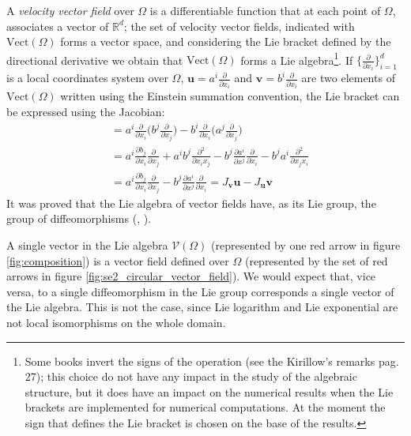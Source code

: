 A \emph{velocity vector field} over $\Omega$ is a differentiable function that at each point of $\Omega$, associates a vector of $\mathbb{R}^d$; the set of velocity vector fields, indicated with $\text{Vect}(\Omega)$ forms a vector space, and considering the Lie bracket defined by the directional derivative
we obtain that $\text{Vect}(\Omega)$ forms a Lie algebra\footnote{
	Some books invert the signs of the operation (see the Kirillow's remarks \cite{kirillov2008introduction} pag. 27); this choice do not have any impact in the study of the algebraic structure, but it does have an impact on the numerical results when the Lie brackets are implemented for numerical computations. At the moment the sign that defines the Lie bracket is chosen on the base of the results.
}.
If $\{\frac{\partial}{\partial x_{i}}\}_{i=1}^{d}$ is a local coordinates system over $\Omega$, $\mathbf{u}=a^{i} \frac{\partial}{\partial x_{i}}$ and $\mathbf{v}=b^{i} \frac{\partial}{\partial x_{i}}$ are two elements of  $\text{Vect}(\Omega)$ written using the Einstein summation convention, the Lie bracket can be expressed using the Jacobian:
\begin{align*}
[\mathbf{u}, \mathbf{v}] &= 
a^{i} \frac{\partial}{\partial x_{i}}\big( b^{j} \frac{\partial}{\partial x_{j}} \big)
-
b^{i} \frac{\partial}{\partial x_{i}}\big( a^{j} \frac{\partial}{\partial x_{j}} \big) \\
&=
a^{i} \frac{\partial b_{j}}{\partial x_{i}}\frac{\partial}{\partial x_{j}}  
+ 
a^{i}b^{j}\frac{\partial^{2}}{\partial x_{i}x_{j}}
- 
b^{j} \frac{\partial a^{i}}{\partial x^{j}}\frac{\partial}{\partial x_{i}} 
-
b^{j}a^{i}\frac{\partial^{2}}{\partial x_{j}x_{i}} \\
&=
a^{i} \frac{\partial b_{j}}{\partial x_{i}}\frac{\partial}{\partial x_{j}}
-
b^{j} \frac{\partial a^{i}}{\partial x^{j}}\frac{\partial}{\partial x_{i}} 
= J_{\mathbf{v}}\mathbf{u} - J_{\mathbf{u}}\mathbf{v}
\end{align*}
It was proved that the Lie algebra of vector fields have, as its Lie group, the group of diffeomorphisms (\cite{milnor1982infinite}, \cite{ovsienko1992integrals}). 

A single vector in the Lie algebra $\mathcal{V}(\Omega)$ (represented by one red arrow in figure \ref{fig:composition}) is a vector field defined over $\Omega$ (represented by the set of red arrows in figure \ref{fig:se2_circular_vector_field}). We would expect that, vice versa, to a single diffeomorphism in the Lie group corresponds a single vector of the Lie algebra. This is not the case, since Lie logarithm and Lie exponential are not local isomorphisms on the whole domain.

